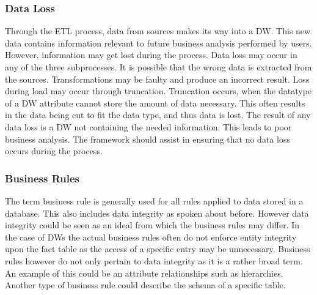\subsubsection{Data Loss}
Through the ETL process, data from sources makes its way into a DW. This new data contains information relevant to future business analysis performed by users. However, information may get lost during the process. Data loss may occur in any of the three subprocesses. It is possible that the wrong data is extracted from the sources. Transformations may be faulty and produce an incorrect result. Loss during load may occur through truncation. Truncation occurs, when the datatype of a DW attribute cannot store the amount of data necessary. This often results in the data being cut to fit the data type, and thus data is lost. The result of any data loss is a DW not containing the needed information. This leads to poor business analysis. The framework should assist in ensuring that no data loss occurs during the process.

\subsubsection{Business Rules}
The term business rule is generally used for all rules applied to data stored in a database. This also includes data integrity as spoken about before. However data integrity could be seen as an ideal from which the business rules may differ. In the case of DWs the actual business rules often do not enforce entity integrity upon the fact table as the access of a specific entry may be unnecessary. Business rules however do not only pertain to data integrity as it is a rather broad term. An example of this could be an attribute relationships such as hierarchies. Another type of business rule could describe the schema of a specific table.








